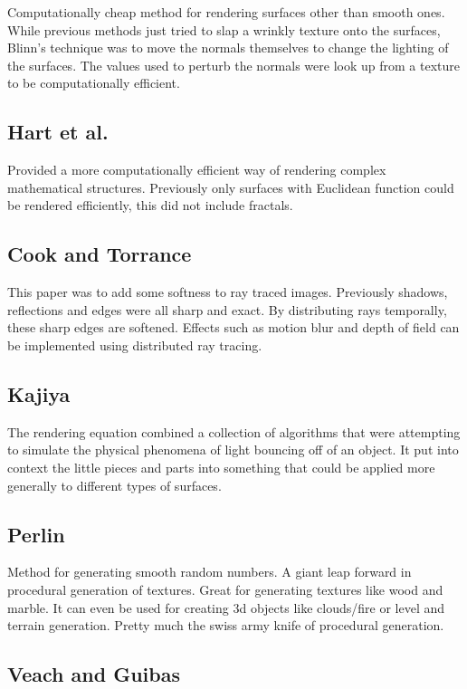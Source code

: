 \documentclass{article}
\begin{document}
Computationally cheap method for rendering surfaces other than smooth ones. While previous methods just tried
to slap a wrinkly texture onto the surfaces, Blinn's technique was to move the normals themselves to change the
lighting of the surfaces. The values used to perturb the normals were look up from a texture to be computationally
efficient.

\subsection{Hart et al.}

Provided a more computationally efficient way of rendering complex mathematical structures.
Previously only surfaces with Euclidean function could be rendered efficiently, this did not
include fractals.

\subsection{Cook and Torrance}

This paper was to add some softness to ray traced images. Previously shadows, reflections and
edges were all sharp and exact. By distributing rays temporally, these sharp edges are softened.
Effects such as motion blur and depth of field can be implemented using distributed ray tracing.

\subsection{Kajiya}

The rendering equation combined a collection of algorithms that were attempting to simulate
the physical phenomena of light bouncing off of an object. It put into context the little
pieces and parts into something that could be applied more generally to different types of
surfaces.

\subsection{Perlin}

Method for generating smooth random numbers. A giant leap forward in procedural generation
of textures. Great for generating textures like wood and marble. It can even be used for creating
3d objects like clouds/fire or level and terrain generation. Pretty much the swiss army knife
of procedural generation.

\subsection{Veach and Guibas}
\end{document}
